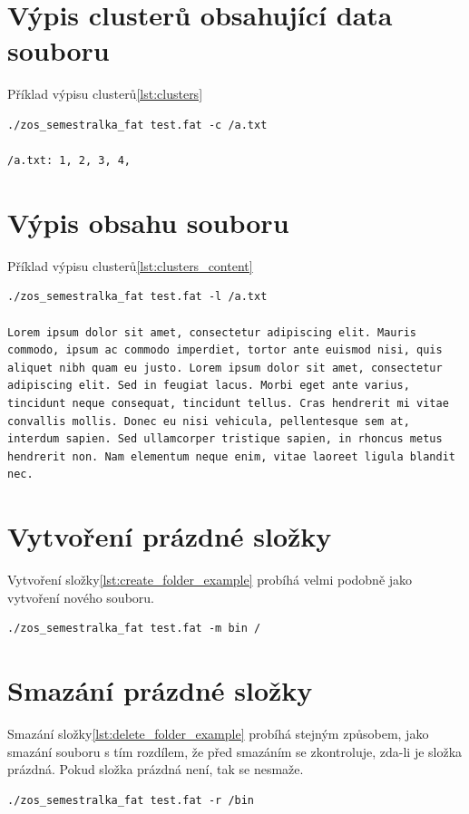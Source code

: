 \documentclass{report}
\begin{document}
\section*{Výpis clusterů obsahující data souboru}
Příklad výpisu clusterů\ref{lst:clusters}
\begin{lstlisting}[caption=Výpis clusterů obsahující data souboru,label=lst:clusters, language={}]
./zos_semestralka_fat test.fat -c /a.txt

/a.txt: 1, 2, 3, 4,
 \end{lstlisting}
 

\section*{Výpis obsahu souboru}
Příklad výpisu clusterů\ref{lst:clusters_content}
\begin{lstlisting}[caption=Výpis obsahu zadaného souboru,label=lst:clusters_content, language={}]
./zos_semestralka_fat test.fat -l /a.txt

Lorem ipsum dolor sit amet, consectetur adipiscing elit. Mauris commodo, ipsum ac commodo imperdiet, tortor ante euismod nisi, quis aliquet nibh quam eu justo. Lorem ipsum dolor sit amet, consectetur adipiscing elit. Sed in feugiat lacus. Morbi eget ante varius, tincidunt neque consequat, tincidunt tellus. Cras hendrerit mi vitae convallis mollis. Donec eu nisi vehicula, pellentesque sem at, interdum sapien. Sed ullamcorper tristique sapien, in rhoncus metus hendrerit non. Nam elementum neque enim, vitae laoreet ligula blandit nec.
 \end{lstlisting}
 

\section*{Vytvoření prázdné složky}
Vytvoření složky\ref{lst:create_folder_example} probíhá velmi podobně jako vytvoření nového souboru.
\begin{lstlisting}[caption=Smazání souboru,label=lst:create_folder_example, language={}]
./zos_semestralka_fat test.fat -m bin /
 \end{lstlisting}

\section*{Smazání prázdné složky}
Smazání složky\ref{lst:delete_folder_example} probíhá stejným způsobem, jako smazání souboru s tím rozdílem, že před smazáním se zkontroluje, zda-li je složka prázdná. Pokud složka prázdná není, tak se nesmaže.
\begin{lstlisting}[caption=Smazání souboru,label=lst:delete_folder_example, language={}]
./zos_semestralka_fat test.fat -r /bin
 \end{lstlisting}
\end{document}
